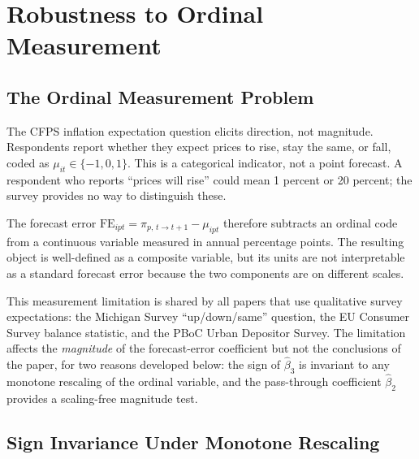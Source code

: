 
\section{Robustness to Ordinal Measurement}\label{app:scaling}

\subsection{The Ordinal Measurement Problem}

The CFPS inflation expectation question elicits direction, not
magnitude.
Respondents report whether they expect prices to rise, stay the
same, or fall, coded as $\mu_{it} \in \{-1, 0, 1\}$.
This is a categorical indicator, not a point forecast.
A respondent who reports ``prices will rise'' could mean
1 percent or 20 percent; the survey provides no way to
distinguish these.

The forecast error
$\mathrm{FE}_{ipt} = \pi_{p,\,t\to t+1} - \mu_{ipt}$
therefore subtracts an ordinal code from a continuous variable
measured in annual percentage points.
The resulting object is well-defined as a composite variable,
but its units are not interpretable as a standard forecast
error because the two components are on different scales.

This measurement limitation is shared by all papers that use
qualitative survey expectations: the Michigan Survey
``up/down/same'' question, the EU Consumer Survey balance
statistic, and the PBoC Urban Depositor Survey.
The limitation affects the \textit{magnitude} of the
forecast-error coefficient but not the conclusions of the
paper, for two reasons developed below: the sign of
$\hat{\beta}_3$ is invariant to any monotone rescaling of the
ordinal variable, and the pass-through coefficient
$\hat{\beta}_2$ provides a scaling-free magnitude test.

\subsection{Sign Invariance Under Monotone Rescaling}

